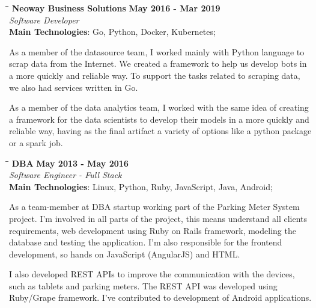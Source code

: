 \documentclass[margin]{res}
\begin{document}
\begin{resume}
\vspace{-0.1in}
   \begin{tabbing}
   \hspace{2.3in}\= \hspace{1.7in}\= \kill %
    \textbf{Neoway Business Solutions}    \>\>\textbf{May 2016 - Mar 2019}\\
    \textit{Software Developer}\\
    \textbf{Main Technologies}: Go, Python, Docker, Kubernetes;
   \end{tabbing}\vspace{-20pt}      %
    \vspace{2mm}

As a member of the datasource team, I worked mainly with Python language to scrap data from the Internet. We created a framework to help us develop bots in a more quickly and reliable way.
To support the tasks related to scraping data, we also had services written in Go.


As a member of the data analytics team, I worked with the same idea of creating a framework for the data scientists to develop their models in a more quickly and reliable way, having as the final artifact a variety of options like a python package or a spark job.


\vspace{-0.1in}
   \begin{tabbing}
   \hspace{2.3in}\= \hspace{1.7in}\= \kill %
    \textbf{DBA}    \>\>\textbf{May 2013 - May 2016}\\
    \textit{Software Engineer - Full Stack}\\
    \textbf{Main Technologies}: Linux, Python, Ruby, JavaScript, Java, Android;
   \end{tabbing}\vspace{-20pt}      %
    \vspace{2mm}
As a team-member at DBA startup working part of the Parking Meter System project. I'm involved in all parts of the project, this means understand all clients requirements, web development using Ruby on Rails framework, modeling the database and testing the application. I'm also responsible for the frontend development, so hands on JavaScript (AngularJS) and HTML.

I also developed REST APIs to improve the communication with the devices, such as tablets and parking meters. The REST API was developed using Ruby/Grape framework. I've contributed to development of Android applications.


\end{resume}
\end{document}
